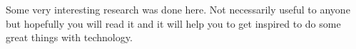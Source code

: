Some very interesting research was done here. Not necessarily useful to anyone but hopefully you will read it and it will help you to get inspired to do some great things with technology.

